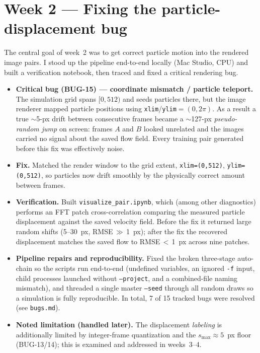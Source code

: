 \documentclass[11pt]{article}
\newcommand{\code}[1]{\texttt{\small #1}}
\begin{document}
\section{Week 2 --- Fixing the particle-displacement bug}
The central goal of week~2 was to get correct particle motion into the rendered
image pairs. I stood up the pipeline end-to-end locally (Mac Studio, CPU) and
built a verification notebook, then traced and fixed a critical rendering bug.

\begin{itemize}
  \item \textbf{Critical bug (BUG-15) --- coordinate mismatch / particle teleport.}
        The simulation grid spans $[0,512)$ and seeds particles there, but the image
        renderer mapped particle positions using \code{xlim}/\code{ylim}$=(0,2\pi)$.
        As a result a true $\sim$5-px drift between consecutive frames became a
        $\sim$127-px \emph{pseudo-random jump} on screen: frames $A$ and $B$ looked
        unrelated and the images carried no signal about the saved flow field. Every
        training pair generated before this fix was effectively noise.
  \item \textbf{Fix.} Matched the render window to the grid extent,
        \code{xlim=(0,512)}, \code{ylim=(0,512)}, so particles now drift smoothly by
        the physically correct amount between frames.
  \item \textbf{Verification.} Built \code{visualize\_pair.ipynb}, which (among other
        diagnostics) performs an FFT patch cross-correlation comparing the measured
        particle displacement against the saved velocity field. Before the fix it
        returned large random shifts (5--30~px, RMSE\,$\gg$\,1~px); after the fix the
        recovered displacement matches the saved flow to RMSE\,$<$\,1~px across nine
        patches.
  \item \textbf{Pipeline repairs and reproducibility.} Fixed the broken three-stage
        auto-chain so the scripts run end-to-end (undefined variables, an ignored
        \code{-f} input, child processes launched without \code{--project}, and a
        combined-file naming mismatch), and threaded a single master \code{--seed}
        through all random draws so a simulation is fully reproducible. In total,
        7 of 15 tracked bugs were resolved (see \code{bugs.md}).
  \item \textbf{Noted limitation (handled later).} The displacement \emph{labeling}
        is additionally limited by integer-frame quantization and the
        $s_{\max}\!\approx\!5$~px floor (BUG-13/14); this is examined and addressed
        in weeks~3--4.
\end{itemize}
\end{document}
